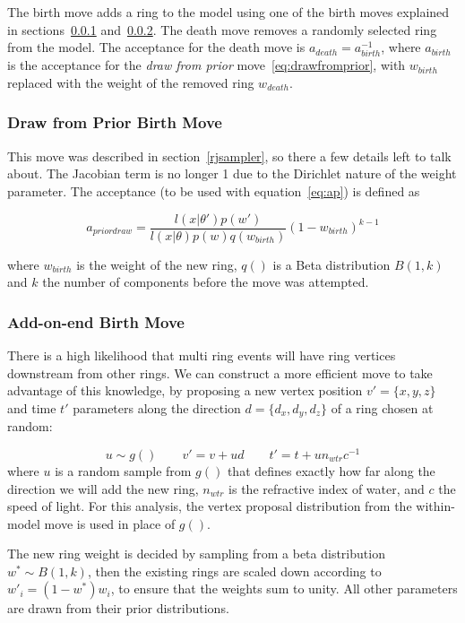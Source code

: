 \documentclass[11pt]{article} %
\begin{document}
The birth move adds a ring to the model using one of the birth moves explained in sections~\ref{drawfromprior} and~\ref{addonend}.
The death move removes a randomly selected ring from the model. The acceptance for the death move is $a_{death} = a_{birth}^{-1}$, where $a_{birth}$ is the acceptance for the \emph{draw from prior} move~\ref{eq:drawfromprior}, with $w_{birth}$ replaced with the weight of the removed ring $w_{death}$.

\subsubsection{Draw from Prior Birth Move}\label{drawfromprior}
This move was described in section~\ref{rjsampler}, so there a few details left to talk about. The Jacobian term is no longer 1 due to the Dirichlet nature of the weight parameter. The acceptance (to be used with equation~\ref{eq:ap}) is defined as

\begin{equation}\label{eq:drawfromprior}
a_{prior draw} = \frac{l(x|\theta')p(w')} {l(x|\theta)p(w)q(w_{birth})}(1-w_{birth})^{k-1}
\end{equation}

where $w_{birth}$ is the weight of the new ring, $q()$ is a Beta distribution $B(1,k)$ and $k$ the number of components before the move was attempted.

\subsubsection{Add-on-end Birth Move}\label{addonend}
There is a high likelihood that multi ring events will have ring vertices downstream from other rings. We can construct a more efficient move to take advantage of this knowledge, by proposing a new vertex position $v'=\{x,y,z\}$ and time $t'$ parameters along the direction $d=\{d_{x},d_{y},d_{z}\}$ of a ring chosen at random:

\begin{equation}
u\sim g() \qquad v' = v + ud\qquad t' = t + un_{wtr}c^{-1}
\end{equation}
where $u$ is a random sample from $g()$ that defines exactly how far along the direction we will add the new ring, $n_{wtr}$ is the refractive index of water, and $c$ the speed of light. For this analysis, the vertex proposal distribution from the within-model move is used in place of $g()$.

The new ring weight is decided by sampling from a beta distribution $w^{*}\sim B(1,k)$, then the existing rings are scaled down according to $w'_{i}=(1-w^{*})w_{i}$, to ensure that the weights sum to unity.
All other parameters are drawn from their prior distributions.
\end{document}

